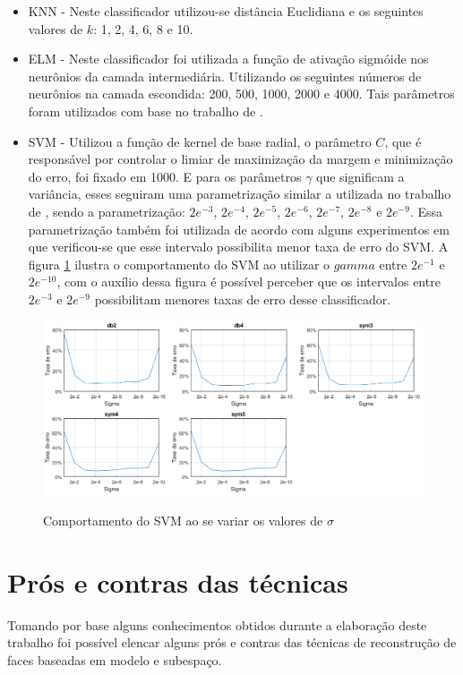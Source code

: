 \begin{itemize}
\item KNN - Neste classificador utilizou-se distância Euclidiana e os seguintes valores de $k$: 1, 2, 4, 6, 8 e 10.
\item ELM - Neste classificador foi utilizada a função de ativação sigmóide nos neurônios da camada intermediária. Utilizando os seguintes números de neurônios na camada escondida: 200, 500, 1000, 2000 e 4000. Tais parâmetros foram utilizados com base no trabalho de .
\item SVM - Utilizou a função de kernel de base radial, o parâmetro $C$, que é responsável por controlar o limiar de maximização da margem e minimização do erro, foi fixado em 1000. E para os parâmetros $\gamma$ que significam a variância, esses seguiram uma parametrização similar a utilizada no trabalho de , sendo a parametrização: $2e^{-3}$, $2e^{-4}$, $2e^{-5}$, $2e^{-6}$, $2e^{-7}$, $2e^{-8}$ e $2e^{-9}$. Essa parametrização também foi utilizada de acordo com alguns experimentos em que verificou-se que esse intervalo  possibilita menor taxa de erro do SVM. A figura \ref{fig:sigmas_svm} ilustra o comportamento do SVM ao utilizar o $gamma$ entre $2e^{-1}$ e $2e^{-10}$, com o auxílio dessa figura é possível perceber que os intervalos entre $2e^{-3}$ e $2e^{-9}$ possibilitam menores taxas de erro desse classificador.
\end{itemize}


\begin{figure}[H]
\centering
\caption{Comportamento do SVM ao se variar os valores de $\sigma$}
\includegraphics[scale=0.51]{imgs2/sigmas_svm}
\label{fig:sigmas_svm}
\end{figure}

\section{Prós e contras das técnicas}
Tomando por base alguns conhecimentos obtidos durante a elaboração deste trabalho foi possível elencar alguns prós e contras das técnicas de reconstrução de faces baseadas em modelo e subespaço.

